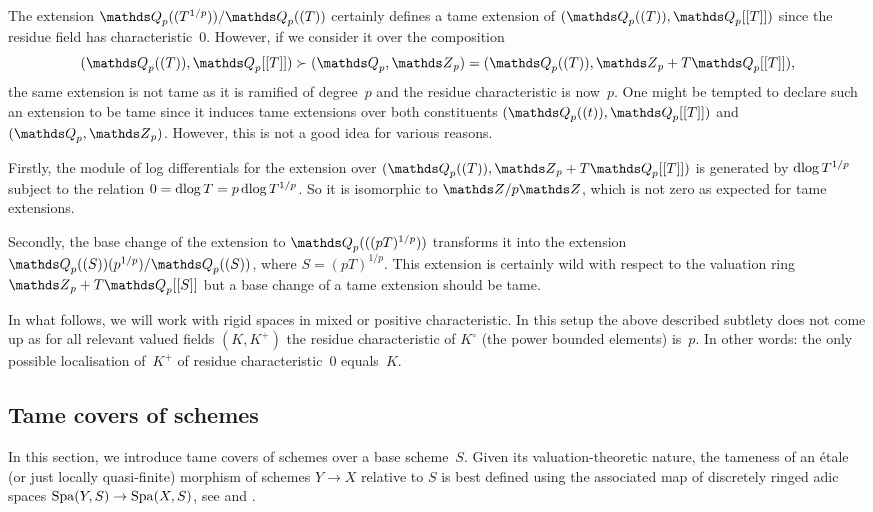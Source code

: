 \begin{rmk}
    The extension $\bQ_p((T^{1/p}))/\bQ_p((T))$ certainly defines a tame extension of $(\bQ_p((T)),\bQ_p[[T]])$ since the residue field has characteristic~$0$.
    However, if we consider it over the composition
    \[
     (\bQ_p((T)),\bQ_p[[T]]) \succ (\bQ_p,\bZ_p) = (\bQ_p((T)),\bZ_p + T\bQ_p[[T]]),
    \]
    the same extension is not tame as it is ramified of degree~$p$ and the residue characteristic is now~$p$.
    One might be tempted to declare such an extension to be tame since it induces tame extensions over both constituents $(\bQ_p((t)),\bQ_p[[T]])$ and $(\bQ_p,\bZ_p)$.
    However, this is not a good idea for various reasons.

    Firstly, the module of log differentials for the extension over $(\bQ_p((T)),\bZ_p + T\bQ_p[[T]])$ is generated by $\operatorname{dlog} T^{1/p}$ subject to the relation $0 = \operatorname{dlog} T = p \operatorname{dlog} T^{1/p}$.
    So it is isomorphic to $\bZ/p\bZ$, which is not zero as expected for tame extensions.

    Secondly, the base change of the extension to $\bQ_p(((pT)^{1/p}))$ transforms it into the extension $\bQ_p((S))(p^{1/p})/\bQ_p((S))$, where $S = (pT)^{1/p}$.
    This extension is certainly wild with respect to the valuation ring $\bZ_p + T\bQ_p[[S]]$ but a base change of a tame extension should be tame.

    In what follows, we will work with rigid spaces in mixed or positive characteristic.
    In this setup the above described subtlety does not come up as for all relevant valued fields $(K,K^+)$ the residue characteristic of $K^\circ$ (the power bounded elements) is~$p$.
    In other words: the only possible localisation of~$K^+$ of residue characteristic~$0$ equals~$K$.
\end{rmk}


\subsection{Tame covers of schemes} 
\label{sec:adic tame discrete case}

In this section, we introduce tame covers of schemes over a base scheme~$S$.
Given its valuation-theoretic nature, the tameness of an \'etale (or just locally quasi-finite) morphism of schemes $Y\to X$ relative to $S$ is best defined using the associated map of discretely ringed adic spaces $\operatorname{Spa}(Y, S)\to \operatorname{Spa}(X, S)$, see \cite[\S3.1]{Temkin2011:RelativeRiemannZariskiSpacesa} and \cite{Hubner2021:AdicTameSite}.

